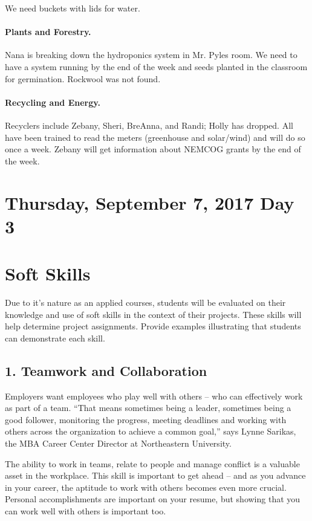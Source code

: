 \documentclass[letterpaper,10pt]{memoir}
\begin{document}
	We need buckets with lids for water.
	
	\paragraph*{Plants and Forestry.}
	Nana is breaking down the hydroponics system in Mr. Pyles room. We need to have a system running by the end of the week and seeds planted in the classroom for germination. Rockwool was not found.

	\paragraph*{Recycling and Energy.}
	Recyclers include Zebany, Sheri, BreAnna, and Randi; Holly has dropped. All have been trained to read the meters (greenhouse and solar/wind) and will do so once a week. Zebany will get information about NEMCOG grants by the end of the week.


\section*{Thursday, September 7, 2017 \hfill Day 3}



\newpage\section*{Soft Skills}

	Due to it's nature as an applied courses, students will be evaluated on their knowledge and use of soft skills in the context of their projects. These skills will help determine project assignments. Provide examples illustrating that students can demonstrate each skill.

	\subsection*{1. Teamwork and Collaboration}
	Employers want employees who play well with others -- who can effectively work as part of a team. ``That means sometimes being a leader, sometimes being a good follower, monitoring the progress, meeting deadlines and working with others across the organization to achieve a common goal,'' says Lynne Sarikas, the MBA Career Center Director at Northeastern University.

	The ability to work in teams, relate to people and manage conflict is a valuable asset in the workplace. This skill is important to get ahead -- and as you advance in your career, the aptitude to work with others becomes even more crucial. Personal accomplishments are important on your resume, but showing that you can work well with others is important too.
\end{document}
